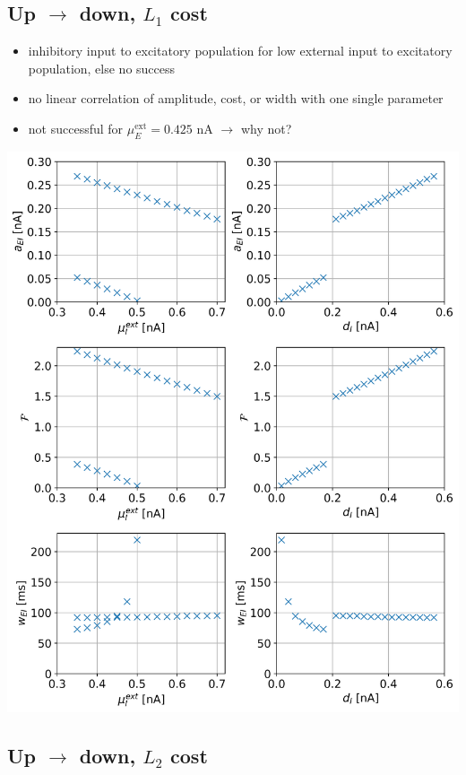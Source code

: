 \documentclass[]{article}
\begin{document}
\subsection{Up $\rightarrow$ down, $L_1$ cost}

\begin{minipage}{0.55\textwidth}
	\begin{itemize}
		\item inhibitory input to excitatory population for low external input to excitatory population, else no success
		\item no linear correlation of amplitude, cost, or width with one single parameter
		\item not successful for $\mu_E^\text{ext} = 0.425$ nA $\rightarrow$ why not?
	\end{itemize}
\end{minipage}
\begin{minipage}{0.43\textwidth}
	\includegraphics[width=\textwidth]{../rate_3.png}
\end{minipage}

\subsection{Up $\rightarrow$ down, $L_2$ cost}
\end{document}
